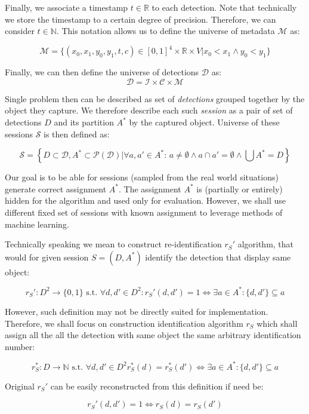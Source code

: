 Finally, we associate a timestamp $t \in \mathbb{R}$ to each detection. Note that
technically we store the timestamp to a certain degree of precision. Therefore,
we can consider $t \in \mathbb{N}$. This notation allows us to define the universe
of metadata $\mathcal{M}$ as:

$$\mathcal{M} = \{{(x_0, x_1, y_0, y_1, t, c) \in [0,1]^4 \times \mathbb{R} \times V | x_0 < x_1 \land y_0 < y_1}\}$$

Finally, we can then define the universe of detections $\mathcal{D}$ as:
$$\mathcal{D} = \mathcal{I \times C \times M}$$

Single problem then can be described as set of \emph{detections} grouped together by the
object they capture. We therefore describe each such \emph{session} as a pair of set of
detections $D$ and its partition $A^*$ by the captured object. Universe of these sessions
$\mathcal{S}$ is then defined as:

$$\mathcal{S} = \left\{D \subset \mathcal{D}, A^* \subset \mathcal{P(D)} \vert \forall a, a' \in A^*:\, a \neq \emptyset \land a \cap a' = \emptyset \land \bigcup A^* = D\right\}$$

Our goal is to be able for sessions (sampled from the real world situations) generate
correct assignment $A^*$. The assignment $A^*$ is (partially or entirely) hidden for
the algorithm and used only for evaluation. However, we shall use different fixed set
of sessions with known assignment to leverage methods of machine learning.

Technically speaking we mean to construct re-identification $r_S'$ algorithm, that would
for given session $S = (D, A^*)$ identify the detection that display same object:

$$r_S': D^2 \rightarrow \{0,1\} \text{ s.t. } \forall d, d' \in D^2 : r_S'(d, d') = 1 \Leftrightarrow \exists a \in A^* : \{d, d'\} \subseteq a$$

However, such definition may not be directly suited for implementation. Therefore, we
shall focus on construction identification algorithm $r_S$ which shall assign all the
all the detection with same object the same arbitrary identification number:

$$r_S^*: D \rightarrow \mathbb{N} \text{ s.t. } \forall d, d' \in D^2 r_S^*(d) = r_S^*(d') \Leftrightarrow \exists a \in A^*: \{d, d'\} \subseteq a$$

Original $r_S'$ can be easily reconstructed from this definition if need be:

$$r_S'(d, d') = 1 \Leftrightarrow r_S(d) = r_S(d')$$

